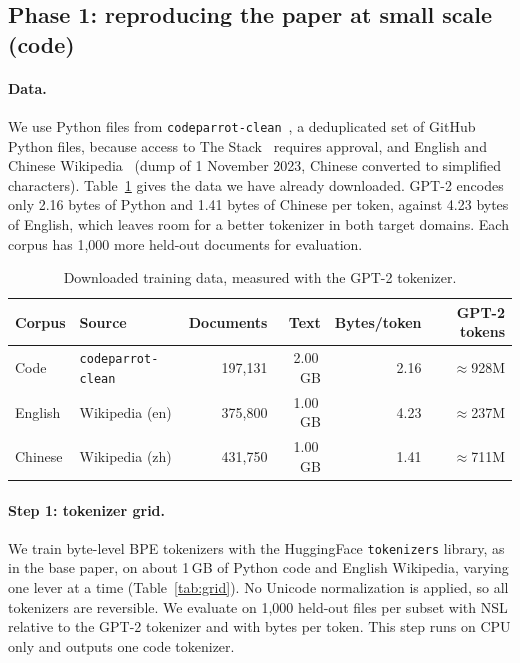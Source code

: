 \documentclass[11pt,a4paper]{article}
\begin{document}
\subsection{Phase 1: reproducing the paper at small scale (code)}

\paragraph{Data.} We use Python files from \texttt{codeparrot-clean}~\citep{codeparrot}, a deduplicated set of GitHub Python files, because access to The Stack~\citep{kocetkov2022stack} requires approval, and English and Chinese Wikipedia~\citep{wikimedia2023} (dump of 1 November 2023, Chinese converted to simplified characters). Table~\ref{tab:data} gives the data we have already downloaded. GPT-2 encodes only 2.16 bytes of Python and 1.41 bytes of Chinese per token, against 4.23 bytes of English, which leaves room for a better tokenizer in both target domains. Each corpus has 1{,}000 more held-out documents for evaluation.

\begin{table}[h]
\centering
\caption{Downloaded training data, measured with the GPT-2 tokenizer.}
\label{tab:data}
\small
\begin{tabular}{llrrrr}
\toprule
Corpus & Source & Documents & Text & Bytes/token & GPT-2 tokens \\
\midrule
Code & \texttt{codeparrot-clean} & 197{,}131 & 2.00\,GB & 2.16 & $\approx$928M \\
English & Wikipedia (en) & 375{,}800 & 1.00\,GB & 4.23 & $\approx$237M \\
Chinese & Wikipedia (zh) & 431{,}750 & 1.00\,GB & 1.41 & $\approx$711M \\
\bottomrule
\end{tabular}
\end{table}

\paragraph{Step 1: tokenizer grid.} We train byte-level BPE tokenizers with the HuggingFace \texttt{tokenizers} library, as in the base paper, on about 1\,GB of Python code and English Wikipedia, varying one lever at a time (Table~\ref{tab:grid}). No Unicode normalization is applied, so all tokenizers are reversible. We evaluate on 1{,}000 held-out files per subset with NSL relative to the GPT-2 tokenizer and with bytes per token. This step runs on CPU only and outputs one code tokenizer.
\end{document}
